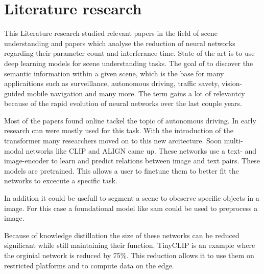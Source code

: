\chapter{Literature research}

This Literature research studied relevant papers in the field of scene understanding
and papers which analyse the reduction of neural networks regarding their parameter count and interferance time.
State of the art is to use deep learning models for scene understanding tasks.
The goal of to discover the semantic information within a given scene, which is the base for many applicaitions such as surveillance, autonomous driving, traffic savety, vision-guided mobile navigation and many more.
The term gains a lot of relevantcy because of the rapid evolution of neural networks over the last couple years.

Most of the papers found online tackel the topic of autonomous driving\cite{sceneunderstandingautdriving1}.
In early research \acrfull{cnn}\cite{SegNet} were mostly used for this task.
With the introduction of the transformer \cite{attentionisallyouneed} many researchers moved on to this new arcitecture.
Soon multi-modal networks like CLIP\cite{clip} and ALIGN\cite{ALIGN} came up.
These networks use a text- and image-encoder to learn and predict relations between image and text pairs.
These models are pretrained.
This allows a user to finetune them to better fit the networks to excecute a specific task.

In addition it could be usefull to segment a scene to obeserve specific objects in a image.
For this case a foundational model like \Acrfull{sam}\cite{sam} could be used to preprocess a image.

Because of knowledge distillation\cite{knowledgedistillation} the size of these networks can be reduced significant while still maintaining their function.
TinyCLIP\cite{tinyclip} is an example where the orginial network is reduced by 75\%.
This reduction allows it to use them on restricted platforms and to compute data on the edge.

